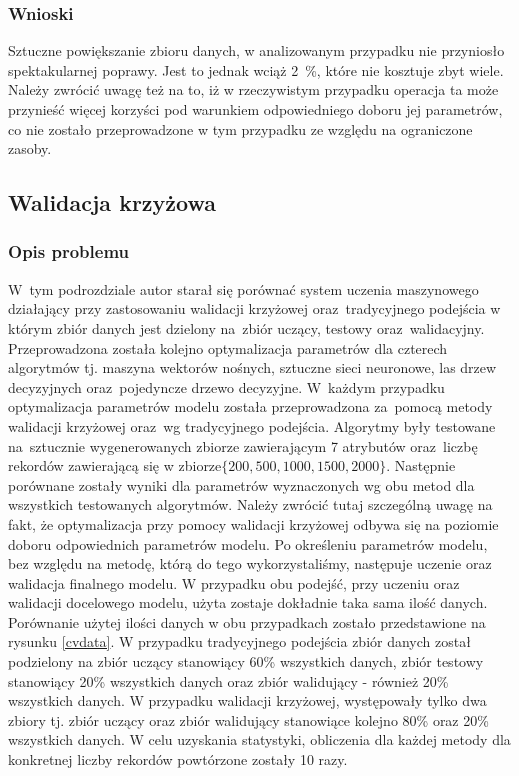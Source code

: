 \subsubsection{Wnioski}
Sztuczne powiększanie zbioru danych, w analizowanym przypadku nie przyniosło spektakularnej poprawy. Jest to jednak wciąż 2~\%, które nie kosztuje zbyt wiele. Należy zwrócić uwagę też na to, iż w rzeczywistym przypadku operacja ta może przynieść więcej korzyści pod warunkiem odpowiedniego doboru jej parametrów, co nie zostało przeprowadzone w tym przypadku ze względu na ograniczone zasoby. 
\subsection{Walidacja krzyżowa}\label{cvChapter}
\subsubsection{Opis problemu}
W~tym podrozdziale autor starał się porównać system uczenia maszynowego działający przy zastosowaniu walidacji krzyżowej oraz~tradycyjnego podejścia w którym zbiór danych jest dzielony na~zbiór uczący, testowy oraz~walidacyjny. Przeprowadzona została kolejno optymalizacja parametrów dla czterech algorytmów tj. maszyna wektorów nośnych, sztuczne sieci neuronowe, las drzew decyzyjnych oraz~pojedyncze drzewo decyzyjne. W~każdym przypadku optymalizacja parametrów modelu została przeprowadzona za~pomocą metody walidacji krzyżowej oraz~wg tradycyjnego podejścia.  Algorytmy były testowane na~sztucznie wygenerowanych zbiorze zawierającym 7 atrybutów oraz~liczbę rekordów zawierającą się w zbiorze$ \{200, 500, 1000, 1500, 2000\}.$ Następnie porównane zostały wyniki dla parametrów wyznaczonych wg obu metod dla wszystkich testowanych algorytmów. Należy zwrócić tutaj szczególną uwagę na fakt, że optymalizacja przy pomocy walidacji krzyżowej odbywa się na poziomie doboru odpowiednich parametrów modelu. Po określeniu parametrów modelu, bez względu na metodę, którą do tego wykorzystaliśmy, następuje uczenie oraz walidacja finalnego modelu. W przypadku obu podejść, przy uczeniu oraz walidacji docelowego modelu, użyta zostaje dokładnie taka sama ilość danych. Porównanie użytej ilości danych w obu przypadkach zostało przedstawione na rysunku \ref{cvdata}. W przypadku tradycyjnego podejścia zbiór danych został podzielony na zbiór uczący stanowiący 60\% wszystkich danych, zbiór testowy stanowiący 20\% wszystkich danych oraz zbiór walidujący - również 20\% wszystkich danych. W przypadku walidacji krzyżowej, występowały tylko dwa zbiory tj. zbiór uczący oraz zbiór walidujący stanowiące kolejno 80\% oraz 20\% wszystkich danych. W celu uzyskania statystyki, obliczenia dla każdej metody dla konkretnej liczby rekordów powtórzone zostały 10 razy.

